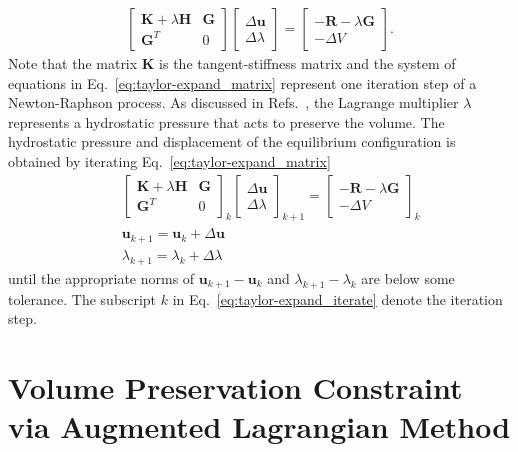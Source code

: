 %
\begin{eqnarray}
\begin{bmatrix}
\textbf{K} + \lambda \textbf{H} & \textbf{G} \\
\textbf{G}^T & 0 
\end{bmatrix}
%
\begin{bmatrix}
\Delta \textbf{u} \\ \Delta \lambda
\end{bmatrix}
%
= \begin{bmatrix}
-\textbf{R}-\lambda \textbf{G} \\
- \Delta V 
\end{bmatrix}.
\label{eq:taylor-expand_matrix}
\end{eqnarray}
%
Note that the matrix \textbf{K} is the tangent-stiffness matrix and the system of equations in Eq.\ \eqref{eq:taylor-expand_matrix} represent one iteration step of a Newton-Raphson process. As discussed in Refs.\ \cite{Hirota:2000jw,Lai:2013fp}, the Lagrange multiplier $\lambda$ represents a hydrostatic pressure that acts to preserve the volume. The hydrostatic pressure and displacement of the equilibrium configuration is obtained by iterating Eq.\ \eqref{eq:taylor-expand_matrix}
%
\begin{eqnarray}
&&\begin{bmatrix}
\textbf{K} + \lambda \textbf{H} & \textbf{G} \\
\textbf{G}^T & 0 
\end{bmatrix}_k
%
\begin{bmatrix}
\Delta \textbf{u} \\ \Delta \lambda
\end{bmatrix}_{k+1}
%
= \begin{bmatrix}
-\textbf{R}-\lambda \textbf{G} \\
- \Delta V 
\end{bmatrix}_k \nonumber\\
%
&&\textbf{u}_{k+1} = \textbf{u}_k + \Delta \textbf{u} \nonumber\\
%
&&\lambda_{k+1} = \lambda_k + \Delta \lambda
\label{eq:taylor-expand_iterate}
\end{eqnarray}
%
until the appropriate norms of $\textbf{u}_{k+1} - \textbf{u}_k$ and $\lambda_{k+1} - \lambda_k$ are below some tolerance. The subscript $k$ in Eq.\ \eqref{eq:taylor-expand_iterate} denote the iteration step.

\section{Volume Preservation Constraint via Augmented Lagrangian Method}

